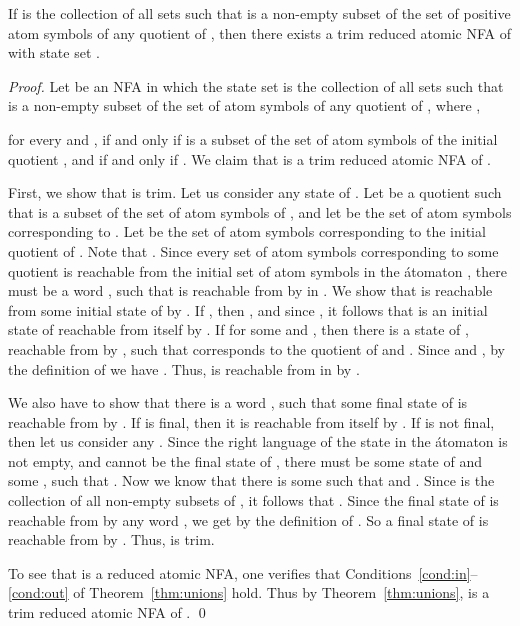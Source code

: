 \documentclass{llncs}
\begin{document}
\begin{theorem}
\label{thm:subsets}
If  is the collection of all sets  such that 
 is a non-empty subset of the set of positive atom symbols 
 of any quotient  of , 
then there exists a trim reduced atomic NFA of  with  state set .
\end{theorem}
\begin{proof}
Let  be an NFA in which the state set 
 is the collection of all sets  such that 
 is a non-empty subset of the set of atom symbols 
 of any quotient  of , 
where ,

for every  and ,
 if and only if  is a subset of the set of atom symbols 
of the initial quotient , and 
 if and only if . 
We claim that  is a trim reduced atomic NFA of .

First, we show that  is trim. 
Let us consider any state  of .
Let  be a quotient such that  is a subset of the set of atom symbols
of , and let  be the set of atom symbols corresponding to .
Let  be the set of atom symbols corresponding to the initial
quotient  of . Note that .
Since every set of atom symbols corresponding to some quotient is reachable
from the initial set of atom symbols in the \'atomaton , 
there must be a word , such that  is reachable 
from  by  in . 
We show that  is reachable from some initial state of  by .
If , then , and since , it follows 
that  is an initial state of  reachable from itself 
by .
If  for some  and , then there is a state
 of , reachable from  by , such that 
 corresponds to the quotient  of  and 
. 
Since  and , 
by the definition of  we have 
. 
Thus,  is reachable from  in  by .

We also have to show that there is a word , such that some 
final state of  is reachable from  by .
If  is final, then it is reachable from itself by .
If  is not final, then let us consider any . 
Since the right language of the state  in the \'atomaton  
is not empty, and  cannot be the final state of , there must be 
some state  of  and some , such that 
.
Now we know that there is some  such that  and
. Since  is the collection
of all non-empty subsets of , it follows that 
.
Since the final state  of  is reachable from  by 
any word , we get 
 by the definition of . 
So a final state  of  is reachable from  by .   
Thus,  is trim.

To see that  is a reduced atomic NFA, one verifies that 
Conditions~\ref{cond:in}--\ref{cond:out} of Theorem~\ref{thm:unions} hold.
Thus by Theorem~\ref{thm:unions},  is a trim reduced atomic NFA of .
\qed
\end{proof} 
\end{document}
